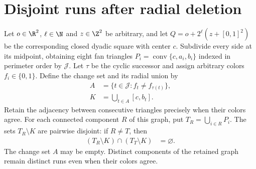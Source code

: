 \section{Disjoint runs after radial deletion}
\label{sec:area_law_disjoint_fan_runs}

\begin{lemma}
    \label{thm:area_law_fan_cut_runs_disjoint}
    \leanok
    Let $o\in\R^2$, $\ell\in\N$ and $z\in\Z^2$ be arbitrary, and let
    $Q=o+2^\ell(z+[0,1]^2)$ be the corresponding closed dyadic square
    with center $c$.
    Subdivide every side at its midpoint, obtaining eight fan triangles
    $P_i=\operatorname{conv}\{c,a_i,b_i\}$ indexed in perimeter order
    by $\mathcal J$.
    Let $\tau$ be the cyclic successor and assign arbitrary colors
    $f_i\in\{0,1\}$. Define the change set and its radial union by
    \begin{align}
        A & =\{t\in\mathcal J:f_t\ne f_{\tau(t)}\}, \\
        K & =\bigcup_{t\in A}[c,b_t].
    \end{align}
    Retain the adjacency between consecutive triangles precisely when
    their colors agree. For each connected component $R$ of this graph,
    put $T_R=\bigcup_{i\in R}P_i$.
    The sets $T_R\setminus K$ are pairwise disjoint: if $R\ne T$, then
    \begin{align}
        (T_R\setminus K)\cap(T_T\setminus K) & =\varnothing.
    \end{align}
    The change set $A$ may be empty. Distinct components of the
    retained graph remain distinct runs even when their colors agree.
\end{lemma}
